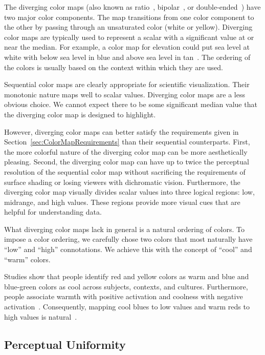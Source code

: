 \documentclass[review,journal]{vgtc}         %
\newcommand{\lcite}[1]{~\cite{#1}}
\begin{document}
The diverging color maps (also known as ratio\lcite{Ware04},
bipolar\lcite{Spence01}, or double-ended\lcite{Rheingans99}) have two major
color components.  The map transitions from one color component to the
other by passing through an unsaturated color (white or yellow).  Diverging
color maps are typically used to represent a scalar with a significant
value at or near the median.  For example, a color map for elevation could
put sea level at white with below sea level in blue and above sea level in
tan\lcite{Tufte97}.  The ordering of the colors is usually based on the
context within which they are used.

Sequential color maps are clearly appropriate for scientific visualization.
Their monotonic nature maps well to scalar values.  Diverging color maps
are a less obvious choice.  We cannot expect there to be some significant
median value that the diverging color map is designed to highlight.

However, diverging color maps can better satisfy the requirements given in
Section~\ref{sec:ColorMapRequirements} than their sequential counterparts.
First, the more colorful nature of the diverging color map can be more
aesthetically pleasing.  Second, the diverging color map can have up to
twice the perceptual resolution of the sequential color map without
sacrificing the requirements of surface shading or losing viewers
with dichromatic vision.  Furthermore, the diverging color map visually
divides scalar values into three logical regions: low, midrange, and high
values.  These regions provide more visual cues that are helpful for
understanding data.

What diverging color maps lack in general is a natural ordering of colors.
To impose a color ordering, we carefully chose two colors that most
naturally have ``low'' and ``high'' connotations.  We achieve this with the
concept of ``cool'' and ``warm'' colors.

Studies show that people identify red and yellow colors as warm and blue and
blue-green colors as cool across subjects, contexts, and
cultures.  Furthermore, people associate warmth with positive activation
and coolness with negative activation\lcite{Hardin97}.  Consequently,
mapping cool blues to low values and warm reds to high values is
natural\lcite{Fortner97}.


\subsection{Perceptual Uniformity}
\label{sec:PerceptualUniformity}
\end{document}
